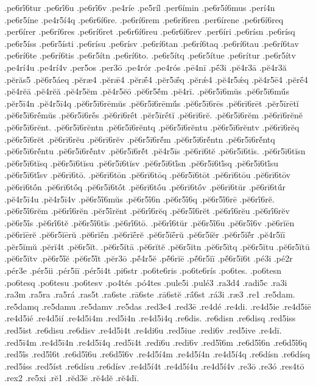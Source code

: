 {.pe6rī́6tur
.pe6rī́6u
.pe6rī́6v
.pe4ríe
.pe5ríl
.per6ímin
.pe6r5í6mus
.perí4n
.pe6r5íne
.pe4r5í4q
.pe6r6í6re.
.pe6rí6rem
.pe6rí6ren
.per6írene
.pe6r6í6req
.per6írer
.pe6rí6res
.pe6rí6ret
.pe6r6í6reu
.pe6r6í6rev
.per6íri
.pe6rísn
.pe6rísq
.pe6r5íss
.pe6r5ísti
.pe6rísu
.pe6rísv
.pe6rí6tan
.pe6rí6taq
.pe6rí6tau
.pe6rí6tav
.pe6rí6te
.pe6rí6tis
.pe6r5ítn
.pe6rí6to.
.pe6r5ítq
.pe6r5ítue
.pe6rítur
.pe6r5ítv
.pe4rí4u
.pe4rí4v
.per5os
.per3ō
.pe4rór
.pe4rós
.pē4nī
.pḗ3i
.pĕ4r3ā
.pĕ4r3ă
.pĕrăs5
.pĕ6r5áeq
.pĕræ4
.pĕrǣ4
.pĕrǣ́4
.pĕr5ǣ́q
.pĕrǽ4
.pĕ4r5ǽq
.pĕ4r5ē4
.pĕrḗ4
.pĕ4rĕā
.pĕ4rĕă
.pĕ4r5ĕm
.pĕ4r5ĕō
.pĕ6r5ĕ́m
.pĕ4rī.
.pĕ6r5ī6mŭs
.pĕ6r5ī6mŭ́s
.pĕr5ī4n
.pĕ4r5ī4q
.pĕ6r5ī6rēmŭs
.pĕ6r5ī6rēmŭ́s
.pĕ6r5ī6rēs
.pĕ6rī6rēt
.pĕr5īrētĭ
.pĕ6r5ī6rḗmŭs
.pĕ6r5ī6rḗs
.pĕ6rī6rḗt
.pĕr5īrḗtĭ
.pĕ6rī6rĕ.
.pĕ6r5ī6rĕm
.pĕ6rī6rĕnĕ
.pĕ6r5ī6rĕnt.
.pĕ6r5ī6rĕntn
.pĕ6r5ī6rĕntq
.pĕ6r5ī6rĕntu
.pĕ6r5ī6rĕntv
.pĕ6rī6rĕq
.pĕ6r5ī6rĕt
.pĕ6rī6rĕu
.pĕ6rī6rĕv
.pĕ6r5ī6rĕ́m
.pĕ6r5ī6rĕ́ntn
.pĕ6r5ī6rĕ́ntq
.pĕ6r5ī6rĕ́ntu
.pĕ6r5ī6rĕ́ntv
.pĕ6r5ī6rĕ́t
.pĕ4r5īs
.pĕ6rī6tĕ
.pĕ6r5ī6tĭs.
.pĕ6r5ī6tĭsn
.pĕ6r5ī6tĭsq
.pĕ6r5ī6tĭsu
.pĕ6r5ī6tĭsv
.pĕ6r5ī6tĭ́sn
.pĕ6r5ī6tĭ́sq
.pĕ6r5ī6tĭ́su
.pĕ6r5ī6tĭ́sv
.pĕ6rī6tō.
.pĕ6rī6tōn
.pĕ6rī6tōq
.pĕ6r5ī6tōt
.pĕ6rī6tōu
.pĕ6rī6tōv
.pĕ6rī6tṓn
.pĕ6rī6tṓq
.pĕ6r5ī6tṓt
.pĕ6rī6tṓu
.pĕ6rī6tṓv
.pĕ6rī6tŭr
.pĕ6rī6tŭ́r
.pĕ4r5ī4u
.pĕ4r5ī4v
.pĕ6r5ī́6mŭs
.pĕ6r5ī́6n
.pĕ6r5ī́6q
.pĕ6r5ī́6rē
.pĕ6rī́6rĕ.
.pĕ6r5ī́6rĕm
.pĕ6rī́6rĕn
.pĕr5ī́rĕnt
.pĕ6rī́6rĕq
.pĕ6r5ī́6rĕt
.pĕ6rī́6rĕu
.pĕ6rī́6rĕv
.pĕ6r5ī́s
.pĕ6rī́6tĕ
.pĕ6r5ī́6tĭs
.pĕ6rī́6tō.
.pĕ6rī́6tŭr
.pĕ6r5ī́6u
.pĕ6r5ī́6v
.pĕ6rĭēn
.pĕ6rĭērĕ
.pĕ6r5ĭērŭ
.pĕ6rĭḗn
.pĕ6rĭḗrĕ
.pĕ6r5ĭḗrŭ
.pĕ6r5ĭĕr
.pĕ6r5ĭĕ́r
.pĕ4r5ĭī
.pĕr5ĭmŭ
.pĕrĭ4t
.pĕ6r5ĭt.
.pĕ6r5ĭtā
.pĕ6rĭtĕ
.pĕ6r5ĭtn
.pĕ6r5ĭtq
.pĕ6r5ĭtu
.pĕ6r5ĭtū
.pĕ6r5ĭtv
.pĕ6r5ĭ́ĕ
.pĕ6r5ĭ́t
.pĕr3ō
.pĕ́4r5ĕ
.pĕ́6rĭē
.pĕ́6r5ĭī
.pĕ́6r5ĭ6t
.pé3i
.pé2r
.pér3e
.pér5ii
.pér5iī
.pér5i4t
.pi6str
.po6te6ris
.po6te6rís
.po6tes.
.po6tesn
.po6tesq
.po6tesu
.po6tesv
.po4tés
.pó4tes
.pule5i
.pulé3
.ra3d4
.radi5c
.ra3i
.ra3m
.ra5ra
.ra5rá
.ras5t
.ra6ste
.rā6ste
.rā6stĕ
.rā́6st
.rá3i
.ræ3
.re1
.re5dam.
.re5damq
.re5damu
.re5damv
.re5das
.red3e4
.red3ē
.re4dé
.re4di.
.re4d5ie
.re4d5iē
.re4d5ié
.re4d5ií
.re4d5i4m
.red5i4n
.re4d5i4q
.re6dis.
.re6disn
.re6disq
.red5iss
.red5ist
.re6disu
.re6disv
.re4d5i4t
.re4di6u
.red5iue
.redi6v
.red5ive
.re4dī.
.red5ī4m
.re4d5ī4n
.re4d5ī4q
.red5ī4t
.redī6u
.redī6v
.red5ī́6m
.re6d5ī́6n
.re6d5ī́6q
.red5ī́s
.red5ī́6t
.re6d5ī́6u
.re6d5ī́6v
.re4d5í4m
.re4d5í4n
.re4d5í4q
.re6dísn
.re6dísq
.red5íss
.red5íst
.re6dísu
.re6dísv
.re4d5í4t
.re4d5í4u
.re4d5í4v
.re3ō
.re3ó
.res4tō
.rex2
.re5xi
.rĕ1
.rĕd3ē
.rĕ4dĕ
.rĕ4dī.
}
